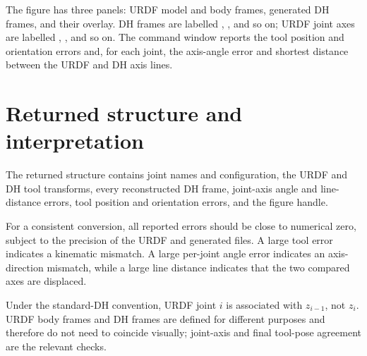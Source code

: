 \documentclass[11pt,a4paper]{article}
\begin{document}
The figure has three panels: URDF model and body frames, generated DH frames,
and their overlay. DH frames are labelled , , and so on;
URDF joint axes are labelled , , and so on. The command
window reports the tool position and orientation errors and, for each joint,
the axis-angle error and shortest distance between the URDF and DH axis lines.

\section{Returned structure and interpretation}

The returned  structure contains joint names and configuration,
the URDF and DH tool transforms, every reconstructed DH frame, joint-axis
angle and line-distance errors, tool position and orientation errors, and the
figure handle.

For a consistent conversion, all reported errors should be close to numerical
zero, subject to the precision of the URDF and generated files. A large tool
error indicates a kinematic mismatch. A large per-joint angle error indicates
an axis-direction mismatch, while a large line distance indicates that the
two compared axes are displaced.

Under the standard-DH convention, URDF joint $i$ is associated with
$z_{i-1}$, not $z_i$. URDF body frames and DH frames are defined for different
purposes and therefore do not need to coincide visually; joint-axis and final
tool-pose agreement are the relevant checks.
\end{document}
